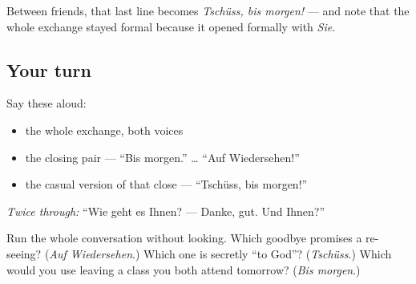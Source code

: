 Between friends, that last line becomes \emph{Tschüss, bis morgen!} — and note that the whole exchange stayed formal because it opened formally with \emph{Sie}.

\subsection*{Your turn}
Say these aloud:

\begin{itemize}
\raggedright
  \item the whole exchange, both voices
  \item the closing pair — \textquotedblleft{}Bis morgen.\textquotedblright{} … \textquotedblleft{}Auf Wiedersehen!\textquotedblright{}
  \item the casual version of that close — \textquotedblleft{}Tschüss, bis morgen!\textquotedblright{}
\end{itemize}

\emph{Twice through:} \textquotedblleft{}Wie geht es Ihnen? — Danke, gut. Und Ihnen?\textquotedblright{}

\begin{tcolorbox}[breakable,colback=teal!4,colframe=teal!35!black,title={Before you move on}]
Run the whole conversation without looking. Which goodbye promises a re-seeing? (\emph{Auf Wiedersehen}.) Which one is secretly \textquotedblleft{}to God\textquotedblright{}? (\emph{Tschüss}.) Which would you use leaving a class you both attend tomorrow? (\emph{Bis morgen}.)
\end{tcolorbox}
